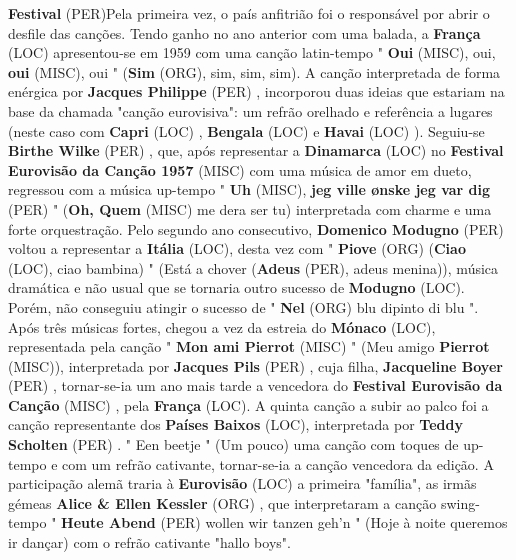 \documentclass[12pt,a4paper]{article}
\begin{document}
\textbf{Festival} (PER)Pela primeira vez, o país anfitrião foi o responsável por abrir o desfile das canções. Tendo ganho no ano anterior com uma balada, a \textbf{França} (LOC) apresentou-se em 1959 com uma canção latin-tempo " \textbf{Oui} (MISC), oui, \textbf{oui} (MISC), oui " (\textbf{Sim} (ORG), sim, sim, sim). A canção interpretada de forma enérgica por \textbf{Jacques Philippe} (PER) , incorporou duas ideias que estariam na base da chamada "canção eurovisiva": um refrão orelhado e referência a lugares (neste caso com \textbf{Capri} (LOC) , \textbf{Bengala} (LOC) e \textbf{Havai} (LOC) ). Seguiu-se \textbf{Birthe Wilke} (PER) , que, após representar a \textbf{Dinamarca} (LOC) no \textbf{Festival Eurovisão da Canção 1957} (MISC) com uma música de amor em dueto, regressou com a música up-tempo " \textbf{Uh} (MISC), \textbf{jeg ville ønske jeg var dig} (PER) " (\textbf{Oh, Quem} (MISC) me dera ser tu) interpretada com charme e uma forte orquestração. Pelo segundo ano consecutivo, \textbf{Domenico Modugno} (PER) voltou a representar a \textbf{Itália} (LOC), desta vez com " \textbf{Piove} (ORG) (\textbf{Ciao} (LOC), ciao bambina) " (Está a chover (\textbf{Adeus} (PER), adeus menina)), música dramática e não usual que se tornaria outro sucesso de \textbf{Modugno} (LOC). Porém, não conseguiu atingir o sucesso de " \textbf{Nel} (ORG) blu dipinto di blu ". Após três músicas fortes, chegou a vez da estreia do \textbf{Mónaco} (LOC), representada pela canção " \textbf{Mon ami Pierrot} (MISC) " (Meu amigo \textbf{Pierrot} (MISC)), interpretada por \textbf{Jacques Pils} (PER) , cuja filha, \textbf{Jacqueline Boyer} (PER) , tornar-se-ia um ano mais tarde a vencedora do \textbf{Festival Eurovisão da Canção} (MISC) , pela \textbf{França} (LOC). A quinta canção a subir ao palco foi a canção representante dos \textbf{Países Baixos} (LOC), interpretada por \textbf{Teddy Scholten} (PER) . " Een beetje " (Um pouco) uma canção com toques de up-tempo e com um refrão cativante, tornar-se-ia a canção vencedora da edição. A participação alemã traria à \textbf{Eurovisão} (LOC) a primeira "família", as irmãs gémeas \textbf{Alice \& Ellen Kessler} (ORG) , que interpretaram a canção swing-tempo " \textbf{Heute Abend} (PER) wollen wir tanzen geh'n " (Hoje à noite queremos ir dançar) com o refrão cativante "hallo boys".
\end{document}
